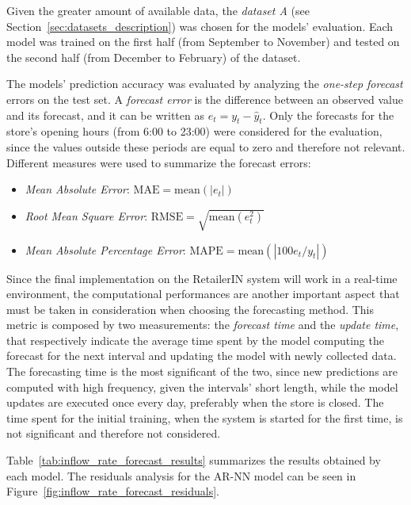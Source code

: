 Given the greater amount of available data, the \emph{dataset A} (see Section~\ref{sec:datasets_description}) was chosen for the models' evaluation. Each model was trained on the first half (from September to November) and tested on the second half (from December to February) of the dataset.

The models’ prediction accuracy was evaluated by analyzing the \emph{one-step forecast} errors on the test set. A \emph{forecast error} is the difference between an observed value and its forecast, and it can be written as \( e_t = y_t - \hat{y}_t \). Only the forecasts for the store’s opening hours (from 6:00 to 23:00) were considered for the evaluation, since the values outside these periods are equal to zero and therefore not relevant. Different measures were used to summarize the forecast errors:
\begin{itemize}
  \item \emph{Mean Absolute Error}: \( \text{MAE} = \text{mean}(| e_t |) \)
  \item \emph{Root Mean Square Error}: \( \text{RMSE} = \sqrt{\text{mean}(e_t^2)} \)
  \item \emph{Mean Absolute Percentage Error}: \( \text{MAPE} =  \text{mean}(| 100 e_t / y_t |) \)
\end{itemize}

Since the final implementation on the RetailerIN system will work in a real-time environment, the computational performances are another important aspect that must be taken in consideration when choosing the forecasting method. This metric is composed by two measurements: the \emph{forecast time} and the \emph{update time}, that respectively indicate the average time spent by the model computing the forecast for the next interval and updating the model with newly collected data. The forecasting time is the most significant of the two, since new predictions are computed with high frequency, given the intervals’ short length, while the model updates are executed once every day, preferably when the store is closed. The time spent for the initial training, when the system is started for the first time, is not significant and therefore not considered.

Table~\ref{tab:inflow_rate_forecast_results} summarizes the results obtained by each model. The residuals analysis for the AR-NN model can be seen in Figure~\ref{fig:inflow_rate_forecast_residuals}.

